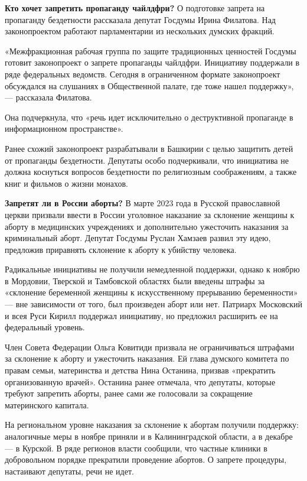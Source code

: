 \textbf{Кто хочет запретить пропаганду чайлдфри?}
О подготовке запрета на пропаганду бездетности рассказала
депутат Госдумы Ирина Филатова.
Над законопроектом работают парламентарии из нескольких
думских фракций.

«Межфракционная рабочая группа по защите традиционных ценностей
Госдумы готовит законопроект о запрете пропаганды чайлдфри.
Инициативу поддержали в ряде федеральных ведомств.
Сегодня в ограниченном формате законопроект обсуждался
на слушаниях в Общественной палате, где тоже нашел поддержку»,
--- рассказала Филатова.

Она подчеркнула, что «речь идет исключительно о деструктивной
пропаганде в информационном пространстве».

Ранее схожий законопроект разрабатывали в Башкирии с целью
защитить детей от пропаганды бездетности.
Депутаты особо подчеркивали, что инициатива не должна коснуться
вопросов бездетности по религиозным соображениям, а также книг
и фильмов о жизни монахов.

\textbf{Запретят ли в России аборты?} В марте 2023 года в Русской
православной церкви призвали ввести в России уголовное наказание
за склонение женщины к аборту в медицинских учреждениях и дополнительно
ужесточить наказания за криминальный аборт.
Депутат Госдумы Руслан Хамзаев развил эту идею,
предложив приравнять склонение к аборту к убийству человека.

Радикальные инициативы не получили немедленной поддержки,
однако к ноябрю в Мордовии, Тверской и Тамбовской областях были
введены штрафы за «склонение беременной женщины к искусственному прерыванию беременности»
--- вне зависимости от того, был произведен аборт или нет.
Патриарх Московский и всея Руси Кирилл поддержал инициативу,
но предложил расширить ее на федеральный уровень.

Член Совета Федерации Ольга Ковитиди призвала не ограничиваться
штрафами за склонение к аборту и ужесточить наказания.
Ей 
глава думского комитета по правам семьи, материнства и детства
Нина Останина, призвав «прекратить организованную
 врачей».
Останина ранее отмечала, что депутаты,
которые требуют запретить аборты,
ранее сами же голосовали за сокращение материнского капитала.

На региональном уровне наказания за склонение к абортам
получили поддержку: аналогичные меры в ноябре приняли и
в Калининградской области, а в декабре --- в Курской.
В ряде регионов власти сообщили, что частные клиники
в добровольном порядке прекратили проведение абортов.
О запрете процедуры, настаивают депутаты, речи не идет.

